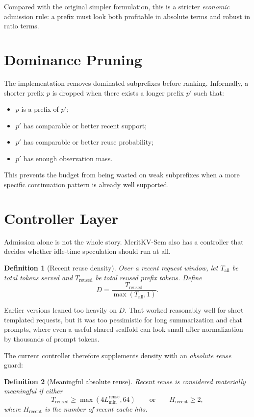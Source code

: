 \documentclass[11pt]{article}
\newtheorem{definition}{Definition}
\begin{document}
Compared with the original simpler formulation, this is a stricter \emph{economic}
admission rule: a prefix must look both profitable in absolute terms and robust in
ratio terms.

\section{Dominance Pruning}

The implementation removes dominated subprefixes before ranking. Informally, a shorter
prefix $p$ is dropped when there exists a longer prefix $p'$ such that:
\begin{itemize}
    \item $p$ is a prefix of $p'$;
    \item $p'$ has comparable or better recent support;
    \item $p'$ has comparable or better reuse probability;
    \item $p'$ has enough observation mass.
\end{itemize}

This prevents the budget from being wasted on weak subprefixes when a more specific
continuation pattern is already well supported.

\section{Controller Layer}

Admission alone is not the whole story. MeritKV-Sem also has a controller that decides
whether idle-time speculation should run at all.

\begin{definition}[Recent reuse density]
Over a recent request window, let $T_{\mathrm{all}}$ be total tokens served and
$T_{\mathrm{reused}}$ be total reused prefix tokens. Define
\[
    D = \frac{T_{\mathrm{reused}}}{\max(T_{\mathrm{all}}, 1)}.
\]
\end{definition}

Earlier versions leaned too heavily on $D$. That worked reasonably well for short
templated requests, but it was too pessimistic for long summarization and chat
prompts, where even a useful shared scaffold can look small after normalization by
thousands of prompt tokens.

The current controller therefore supplements density with an \emph{absolute reuse}
guard:

\begin{definition}[Meaningful absolute reuse]
Recent reuse is considered materially meaningful if either
\[
    T_{\mathrm{reused}} \ge \max(4 L_{\min}^{\mathrm{reuse}}, 64)
    \qquad \text{or} \qquad
    H_{\mathrm{recent}} \ge 2,
\]
where $H_{\mathrm{recent}}$ is the number of recent cache hits.
\end{definition}
\end{document}

